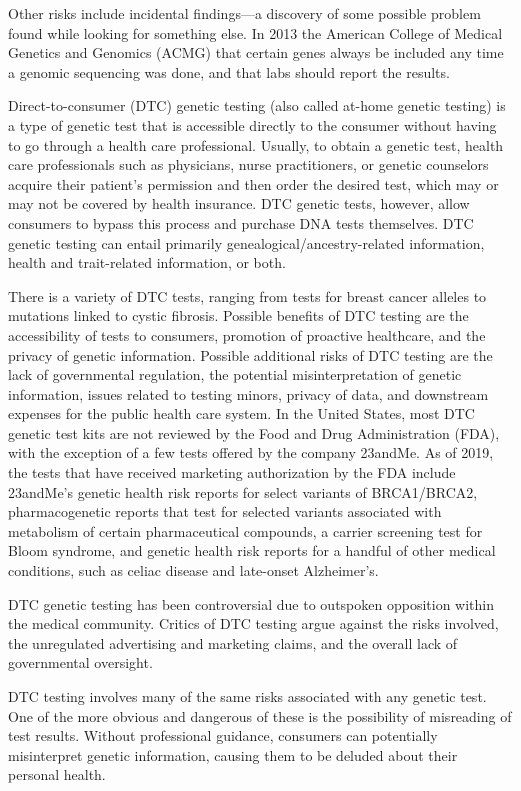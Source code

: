 Other risks include incidental findings---a discovery of some possible problem found while looking for something else. In 2013 the American College of Medical Genetics and Genomics (ACMG) that certain genes always be included any time a genomic sequencing was done, and that labs should report the results.

Direct-to-consumer (DTC) genetic testing (also called at-home genetic testing) is a type of genetic test that is accessible directly to the consumer without having to go through a health care professional. Usually, to obtain a genetic test, health care professionals such as physicians, nurse practitioners, or genetic counselors acquire their patient's permission and then order the desired test, which may or may not be covered by health insurance. DTC genetic tests, however, allow consumers to bypass this process and purchase DNA tests themselves. DTC genetic testing can entail primarily genealogical/ancestry-related information, health and trait-related information, or both.

There is a variety of DTC tests, ranging from tests for breast cancer alleles to mutations linked to cystic fibrosis. Possible benefits of DTC testing are the accessibility of tests to consumers, promotion of proactive healthcare, and the privacy of genetic information. Possible additional risks of DTC testing are the lack of governmental regulation, the potential misinterpretation of genetic information, issues related to testing minors, privacy of data, and downstream expenses for the public health care system. In the United States, most DTC genetic test kits are not reviewed by the Food and Drug Administration (FDA), with the exception of a few tests offered by the company 23andMe. As of 2019, the tests that have received marketing authorization by the FDA include 23andMe's genetic health risk reports for select variants of BRCA1/BRCA2, pharmacogenetic reports that test for selected variants associated with metabolism of certain pharmaceutical compounds, a carrier screening test for Bloom syndrome, and genetic health risk reports for a handful of other medical conditions, such as celiac disease and late-onset Alzheimer's.

DTC genetic testing has been controversial due to outspoken opposition within the medical community. Critics of DTC testing argue against the risks involved, the unregulated advertising and marketing claims, and the overall lack of governmental oversight.

DTC testing involves many of the same risks associated with any genetic test. One of the more obvious and dangerous of these is the possibility of misreading of test results. Without professional guidance, consumers can potentially misinterpret genetic information, causing them to be deluded about their personal health.

